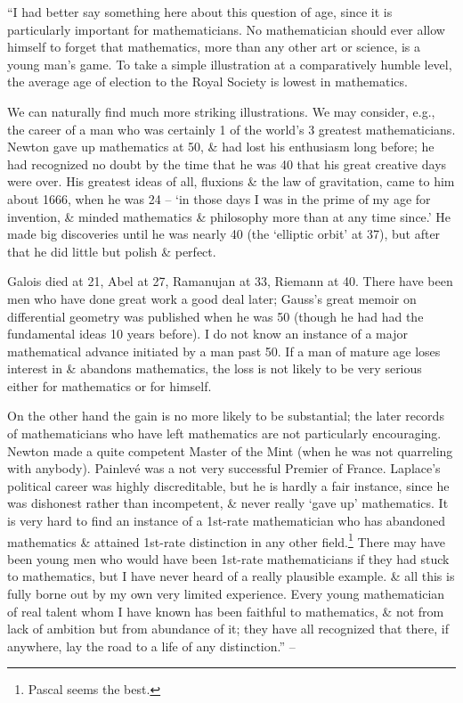 \documentclass{article}
\numberwithin{equation}{section}
\begin{document}
 ``I had better say something here about this question of age, since it is particularly important for mathematicians. No mathematician should ever allow himself to forget that mathematics, more than any other art or science, is a young man's game. To take a simple illustration at a comparatively humble level, the average age of election to the Royal Society is lowest in mathematics.

We can naturally find much more striking illustrations. We may consider, e.g., the career of a man who was certainly 1 of the world's 3 greatest mathematicians. Newton gave up mathematics at 50, \& had lost his enthusiasm long before; he had recognized no doubt by the time that he was 40 that his great creative days were over. His greatest ideas of all, fluxions \& the law of gravitation, came to him about 1666, when he was 24 -- `in those days I was in the prime of my age for invention, \& minded mathematics \& philosophy more than at any time since.' He made big discoveries until he was nearly 40 (the `elliptic orbit' at 37), but after that he did little but polish \& perfect.

Galois died at 21, Abel at 27, Ramanujan at 33, Riemann at 40. There have been men who have done great work a good deal later; Gauss's great memoir on differential geometry was published when he was 50 (though he had had the fundamental ideas 10 years before). I do not know an instance of a major mathematical advance initiated by a man past 50. If a man of mature age loses interest in \& abandons mathematics, the loss is not likely to be very serious either for mathematics or for himself.

On the other hand the gain is no more likely to be substantial; the later records of mathematicians who have left mathematics are not particularly encouraging. Newton made a quite competent Master of the Mint (when he was not quarreling with anybody). Painlev\'e was a not very successful Premier of France. Laplace's political career was highly discreditable, but he is hardly a fair instance, since he was dishonest rather than incompetent, \& never really `gave up' mathematics. It is very hard to find an instance of a 1st-rate mathematician who has abandoned mathematics \& attained 1st-rate distinction in any other field.\footnote{Pascal seems the best.} There may have been young men who would have been 1st-rate mathematicians if they had stuck to mathematics, but I have never heard of a really plausible example. \& all this is fully borne out by my own very limited experience. Every young mathematician of real talent whom I have known has been faithful to mathematics, \& not from lack of ambition but from abundance of it; they have all recognized that there, if anywhere, lay the road to a life of any distinction.'' -- \cite[pp. 70--73]{Hardy1992}
\end{document}
